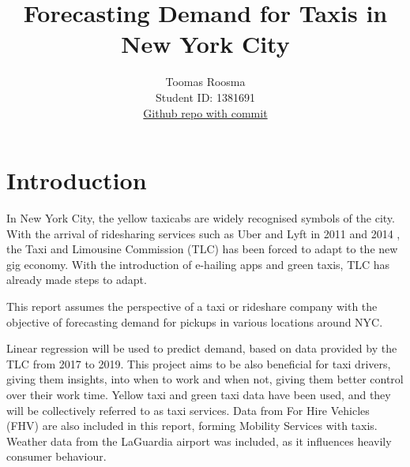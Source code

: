 \documentclass[11pt]{article}
\title{\textbf{Forecasting Demand for Taxis in New York City}}
\author{
Toomas Roosma \\
Student ID: 1381691 \\
\href{https://github.com/MAST30034-Applied-Data-Science/mast30034-project-1-ToomasRo/commit/9eba9d1d58942c1b376e67fc3180e2f3284a6dd9}{Github repo with commit}
}
\begin{document}
\maketitle

\section{Introduction}
In  New York City, the yellow taxicabs are widely recognised symbols of the city. 
With the arrival of ridesharing services such as Uber and Lyft in 2011 \cite{uberStartDate} and 2014 \cite{lyftStartDate}, the Taxi and Limousine Commission (TLC) has been forced to adapt to the new gig economy. With the introduction of e-hailing apps and green taxis, TLC has already made steps to adapt. 

This report assumes the perspective of a taxi or rideshare company with the objective of forecasting demand for pickups in various locations around NYC.

Linear regression will be used to predict demand, based on data provided by the TLC from 2017 to 2019. This project aims to be also beneficial for taxi drivers, giving them insights, into when to work and when not, giving them better control over their work time. Yellow taxi and green taxi data have been used, and they will be collectively referred to as taxi services. Data from For Hire Vehicles (FHV) are also included in this report, forming Mobility Services with taxis. Weather data from the LaGuardia airport was included, as it influences heavily consumer behaviour. 

\end{document}
